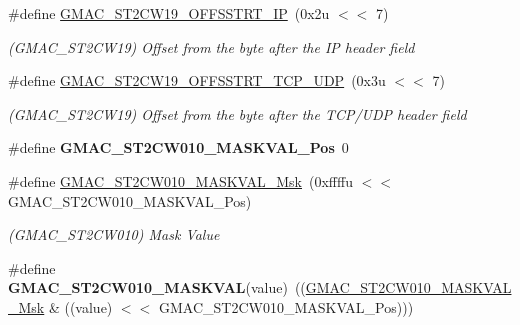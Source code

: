 \begin{DoxyCompactItemize}
\mbox{\label{group__SAMV71__GMAC_ga91613726c9fea2c61d5dbbb8499fdc2a}} 
\#define \mbox{\hyperlink{group__SAMV71__GMAC_ga91613726c9fea2c61d5dbbb8499fdc2a}{G\+M\+A\+C\+\_\+\+S\+T2\+C\+W19\+\_\+\+O\+F\+F\+S\+S\+T\+R\+T\+\_\+\+IP}}~(0x2u $<$$<$ 7)
\begin{DoxyCompactList}\small\item\em (G\+M\+A\+C\+\_\+\+S\+T2\+C\+W19) Offset from the byte after the IP header field \end{DoxyCompactList}\item 
\mbox{\label{group__SAMV71__GMAC_gadc80cd80a0d1aeb794b4de4995281f07}} 
\#define \mbox{\hyperlink{group__SAMV71__GMAC_gadc80cd80a0d1aeb794b4de4995281f07}{G\+M\+A\+C\+\_\+\+S\+T2\+C\+W19\+\_\+\+O\+F\+F\+S\+S\+T\+R\+T\+\_\+\+T\+C\+P\+\_\+\+U\+DP}}~(0x3u $<$$<$ 7)
\begin{DoxyCompactList}\small\item\em (G\+M\+A\+C\+\_\+\+S\+T2\+C\+W19) Offset from the byte after the T\+C\+P/\+U\+DP header field \end{DoxyCompactList}\item 
\mbox{\label{group__SAMV71__GMAC_gaeff1ab3d65c3405c252d25708d4363c4}} 
\#define {\bfseries G\+M\+A\+C\+\_\+\+S\+T2\+C\+W010\+\_\+\+M\+A\+S\+K\+V\+A\+L\+\_\+\+Pos}~0
\item 
\mbox{\label{group__SAMV71__GMAC_ga4d0c11137d266385ce53bc920ac04144}} 
\#define \mbox{\hyperlink{group__SAMV71__GMAC_ga4d0c11137d266385ce53bc920ac04144}{G\+M\+A\+C\+\_\+\+S\+T2\+C\+W010\+\_\+\+M\+A\+S\+K\+V\+A\+L\+\_\+\+Msk}}~(0xffffu $<$$<$ G\+M\+A\+C\+\_\+\+S\+T2\+C\+W010\+\_\+\+M\+A\+S\+K\+V\+A\+L\+\_\+\+Pos)
\begin{DoxyCompactList}\small\item\em (G\+M\+A\+C\+\_\+\+S\+T2\+C\+W010) Mask Value \end{DoxyCompactList}\item 
\mbox{\label{group__SAMV71__GMAC_gae246634a433e3077fc53daedb2eb0d35}} 
\#define {\bfseries G\+M\+A\+C\+\_\+\+S\+T2\+C\+W010\+\_\+\+M\+A\+S\+K\+V\+AL}(value)~((\mbox{\hyperlink{group__SAMV71__GMAC_ga4d0c11137d266385ce53bc920ac04144}{G\+M\+A\+C\+\_\+\+S\+T2\+C\+W010\+\_\+\+M\+A\+S\+K\+V\+A\+L\+\_\+\+Msk}} \& ((value) $<$$<$ G\+M\+A\+C\+\_\+\+S\+T2\+C\+W010\+\_\+\+M\+A\+S\+K\+V\+A\+L\+\_\+\+Pos)))

\end{DoxyCompactItemize}
